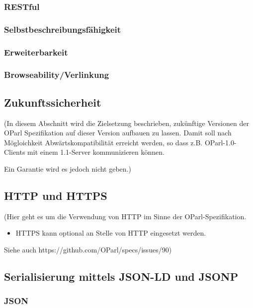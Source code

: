 \documentclass[,a4paper]{article}
\begin{document}
\subsubsection{RESTful}

\subsubsection{Selbstbeschreibungsfähigkeit}

\subsubsection{Erweiterbarkeit}

\subsubsection{Browseability/Verlinkung}

\subsection{Zukunftssicherheit}

(In diesem Abschnitt wird die Zielsetzung beschrieben, zukünftige
Versionen der OParl Spezifikation auf dieser Version aufbauen zu lassen.
Damit soll nach Mögloichkeit Abwärtskompatibilität erreicht werden, so
dass z.B. OParl-1.0-Clients mit einem 1.1-Server kommunizieren können.

Ein Garantie wird es jedoch nicht geben.)

\subsection{HTTP und HTTPS}

(Hier geht es um die Verwendung von HTTP im Sinne der
OParl-Spezifikation.

\begin{itemize}
\item
  HTTPS kann optional an Stelle von HTTP eingesetzt werden.
\end{itemize}

Siehe auch https://github.com/OParl/specs/issues/90)

\subsection{Serialisierung mittels JSON-LD und JSONP}

\subsubsection{JSON}
\end{document}
